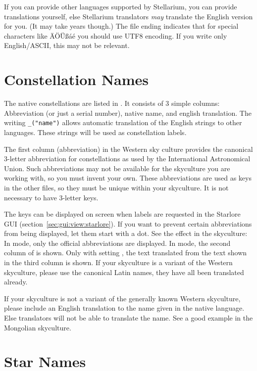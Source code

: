 If you can provide other languages supported by Stellarium, you can
provide translations yourself, else Stellarium translators \emph{may}
translate the English version for you. (It may take years though.) The file
ending  indicates that for special characters like ÄÖÜßáé
you should use UTF8 encoding. If you write only English/ASCII, this may not
be relevant.

\section{Constellation Names}
\label{sec:skycultures:constellations}

The native constellations are listed in
. It consists of 3 simple columns:
Abbreviation (or just a serial number), native name, and english
translation. The writing \texttt{\_("name")} allows automatic
translation of the English strings to other languages. These strings
will be used as constellation labels.

The first column (abbreviation) in the Western sky culture provides
the canonical 3-letter abbreviation for constellations as used by the
International Astronomical Union. Such abbreviations may not be
available for the skyculture you are working with, so you must invent
your own. These abbreviations are used as keys in the other files, so
they must be unique within your skyculture.
It is not necessary to have 3-letter keys. 

The keys can be displayed on screen when labels are requested in the
Starlore GUI (section~\ref{sec:gui:view:starlore}). If you want to prevent
certain abbreviations from being displayed, let them start with a
dot. See the effect in the  skyculture: In
 mode, only the official abbreviations are
displayed. In  mode, the second column of
 is shown. Only with setting
, the text translated from the text shown in the
third column is shown. If your skyculture is a variant of the Western
skyculture, please use the canonical Latin names, they have all been translated already.

If your skyculture is not a variant of the generally known Western
skyculture, please include an English translation to the name given in
the native language. Else translators will not be able to translate
the name. See a good example in the Mongolian skyculture.

\section{Star Names}
\label{sec:skycultures:starnames}

